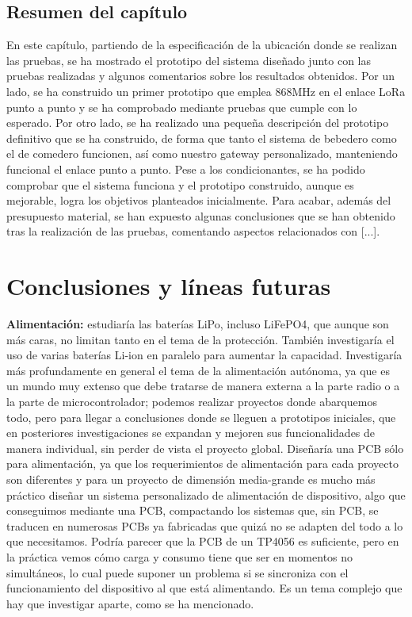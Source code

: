 \documentclass[12pt]{article}
\begin{document}
	\pagebreak
	
	\subsection[Resumen del capítulo]{Resumen del capítulo}
	
	\noindent En este capítulo, partiendo de la especificación de la ubicación donde se realizan las pruebas, se ha mostrado el prototipo del sistema diseñado junto con las pruebas realizadas y algunos comentarios sobre los resultados obtenidos. Por un lado, se ha construido un primer prototipo que emplea 868MHz en el enlace LoRa punto a punto y se ha comprobado mediante pruebas que cumple con lo esperado. Por otro lado, se ha realizado una pequeña descripción del prototipo definitivo que se ha construido, de forma que tanto el sistema de bebedero como el de comedero funcionen, así como nuestro gateway personalizado, manteniendo funcional el enlace punto a punto. Pese a los condicionantes, se ha podido comprobar que el sistema funciona y el prototipo construido, aunque es mejorable, logra los objetivos planteados inicialmente. Para acabar, además del presupuesto material,  se han expuesto algunas conclusiones que se han obtenido tras la realización de las pruebas, comentando aspectos relacionados con  [...]. \\
	
	\pagebreak
	
	\section[Conclusiones y líneas futuras]{Conclusiones y líneas futuras}
	
	\noindent \textbf{Alimentación:} estudiaría las baterías LiPo, incluso LiFePO4, que aunque son más caras, no limitan tanto en el tema de la protección. También investigaría el uso de varias baterías Li-ion en paralelo para aumentar la capacidad. Investigaría más profundamente en general el tema de la alimentación autónoma, ya que es un mundo muy extenso que debe tratarse de manera externa a la parte radio o a la parte de microcontrolador; podemos realizar proyectos donde abarquemos todo, pero para llegar a conclusiones donde se lleguen a prototipos iniciales, que en posteriores investigaciones se expandan y mejoren sus funcionalidades de manera individual, sin perder de vista el proyecto global. Diseñaría una PCB sólo para alimentación, ya que los requerimientos de alimentación para cada proyecto son diferentes y para un proyecto de dimensión media-grande es mucho más práctico diseñar un sistema personalizado de alimentación de dispositivo, algo que conseguimos mediante una PCB, compactando los sistemas que, sin PCB, se traducen en numerosas PCBs ya fabricadas que quizá no se adapten del todo a lo que necesitamos. Podría parecer que la PCB de un TP4056 es suficiente, pero en la práctica vemos cómo carga y consumo tiene que ser en momentos no simultáneos, lo cual puede suponer un problema si se sincroniza con el funcionamiento del dispositivo al que está alimentando. Es un tema complejo que hay que investigar aparte, como se ha mencionado.\\
	
\end{document}
